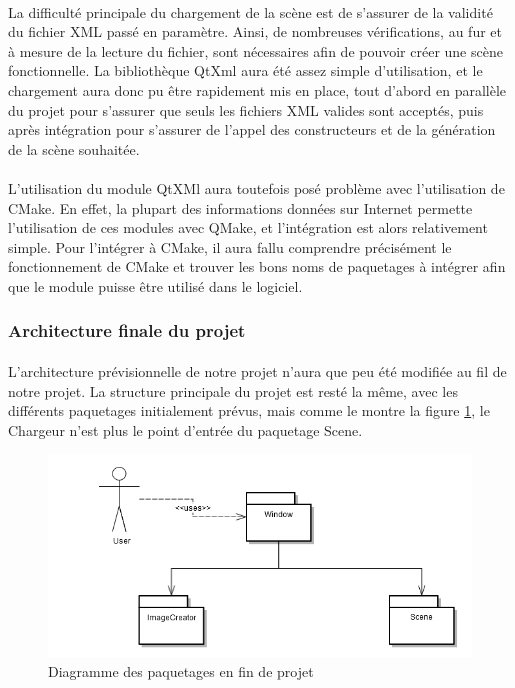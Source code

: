 \paragraph{}
La difficulté principale du chargement de la scène est de s'assurer de la validité du fichier XML passé en paramètre. Ainsi, de nombreuses vérifications, au fur et à mesure de la lecture du fichier, sont nécessaires afin de pouvoir créer une scène fonctionnelle. La bibliothèque QtXml aura été assez simple d'utilisation, et le chargement aura donc pu être rapidement mis en place, tout d'abord en parallèle du projet pour s'assurer que seuls les fichiers XML valides sont acceptés, puis après intégration pour s'assurer de l'appel des constructeurs et de la génération de la scène souhaitée.

\paragraph{}
L'utilisation du module QtXMl aura toutefois posé problème avec l'utilisation de CMake. En effet, la plupart des informations données sur Internet permette l'utilisation de ces modules avec QMake, et l'intégration est alors relativement simple. Pour l'intégrer à CMake, il aura fallu comprendre précisément le fonctionnement de CMake et trouver les bons noms de paquetages à intégrer afin que le module puisse être utilisé dans le logiciel.

\subsubsection{Architecture finale du projet}
\paragraph{}
L'architecture prévisionnelle de notre projet n'aura que peu été modifiée au fil de notre projet. La structure principale du projet est resté la même, avec les différents paquetages initialement prévus, mais comme le montre la figure \ref{fig:archi}, le Chargeur n'est plus le point d'entrée du paquetage Scene.

\begin{figure}[h]
		\centering
                \includegraphics[scale=0.5]{paquetages.png}
		\caption{\label{fig:archi} Diagramme des paquetages en fin de projet \protect \footnotemark}
\end{figure}


